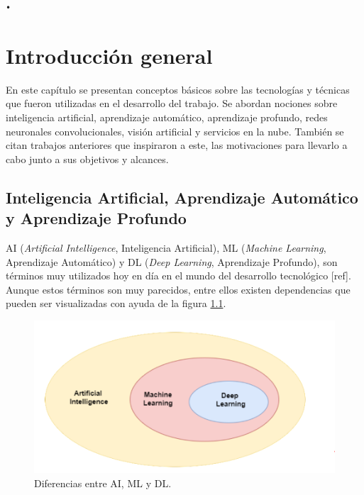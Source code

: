 \texttt{•}%

\chapter{Introducción general} %
\label{Chapter1} %
\label{IntroGeneral}


\newcommand{\keyword}[1]{\textbf{#1}}
\newcommand{\tabhead}[1]{\textbf{#1}}
\newcommand{\code}[1]{\texttt{#1}}
\newcommand{\file}[1]{\texttt{\bfseries#1}}
\newcommand{\option}[1]{\texttt{\itshape#1}}
\newcommand{\grados}{$^{\circ}$}


En este capítulo se presentan conceptos básicos sobre las tecnologías y técnicas que fueron utilizadas en el desarrollo del trabajo. Se abordan nociones sobre inteligencia artificial, aprendizaje automático, aprendizaje profundo, redes neuronales convolucionales, visión artificial y servicios en la nube. También se citan trabajos anteriores que inspiraron a este, las motivaciones para llevarlo a cabo junto a sus objetivos y alcances.

\section{Inteligencia Artificial, Aprendizaje Automático y Aprendizaje Profundo}

AI (\textit{Artificial Intelligence}, Inteligencia Artificial), ML (\textit{Machine Learning}, Aprendizaje Automático) y DL (\textit{Deep Learning}, Aprendizaje Profundo), son términos muy utilizados hoy en día en el mundo del desarrollo tecnológico [ref]. Aunque estos términos son muy parecidos, entre ellos existen dependencias que pueden ser visualizadas con ayuda de la figura \ref{fig:ai_ml_dl}.

\begin{figure}[h]
	\centering
	\includegraphics[scale=0.3]{./Figures/ai_ml_dl.png}
	\caption{Diferencias entre AI, ML y DL.}
	\label{fig:ai_ml_dl}
\end{figure}

